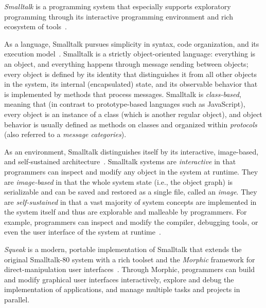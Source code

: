 \emph{Smalltalk} is a programming system that especially supports exploratory programming through its interactive programming environment and rich ecosystem of tools~\cite{ingalls2020evolution}.

As a language, Smalltalk pursues simplicity in syntax, code organization, and its execution model~\cite{goldberg1983smalltalk}.
Smalltalk is a strictly object-oriented language: everything is an object, and everything happens through message sending between objects; every object is defined by its identity that distinguishes it from all other objects in the system, its internal (encapsulated) state, and its observable behavior that is implemented by methods that process messages.
Smalltalk is \emph{class-based}, meaning that (in contrast to prototype-based languages such as JavaScript), every object is an instance of a class (which is another regular object), and object behavior is usually defined as methods on classes and organized within \emph{protocols} (also referred to a \emph{message categories}).

As an environment, Smalltalk distinguishes itself by its interactive, image-based, and self-sustained architecture~\cite{goldberg1984smalltalk}.
Smalltalk systems are \emph{interactive} in that programmers can inspect and modify any object in the system at runtime.
They are \emph{image-based} in that the whole system state (i.e., the object graph) is serializable and can be saved and restored as a single file, called an \emph{image}.
They are \emph{self-sustained} in that a vast majority of system concepts are implemented in the system itself and thus are explorable and malleable by programmers.
For example, programmers can inspect and modify the compiler, debugging tools, or even the user interface of the system at runtime~\cite{taeumel2016evolving}.

\emph{Squeak} is a modern, portable implementation of Smalltalk that extends the original Smalltalk-80 system with a rich toolset and the \emph{Morphic} framework for direct-manipulation user interfaces~\cite{ingalls1997back,ingalls2020evolution,thiede2023squeak}.
Through Morphic, programmers can build and modify graphical user interfaces interactively, explore and debug the implementation of applications, and manage multiple tasks and projects in parallel.


